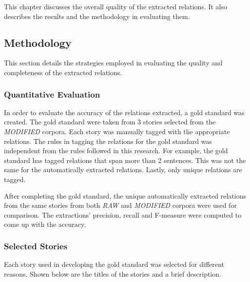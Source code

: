 %
%
%                 

\label{sec:resultsandanalysis}

This chapter discusses the overall quality of the extracted relations. It also describes the results and the methodology in evaluating them.

\subsection{Methodology}
\label{sec:methodology}

This section details the strategies employed in evaluating the quality and completeness of the extracted relations.

\subsubsection{Quantitative Evaluation}

In order to evaluate the accuracy of the relations extracted, a gold standard was created. The gold standard were taken from 3 stories selected from the \textit{MODIFIED} corpora. Each story was manually tagged with the appropriate relations. The rules in tagging the relations for the gold standard was independent from the rules followed in this research. For example, the gold standard has tagged relations that span more than 2 sentences. This was not the same for the automatically extracted relations. Lastly, only unique relations are tagged.

After completing the gold standard, the unique automatically extracted relations from the same stories from both \textit{RAW} and  \textit{MODIFIED} corpora were used for comparison. The extractions' precision, recall and F-measure were computed to come up with the accuracy.

\subsubsection*{Selected Stories}

Each story used in developing the gold standard was selected for different reasons. Shown below are the titles of the stories and a brief description.

